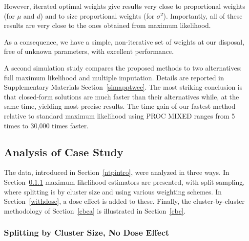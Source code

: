 \documentclass[11pt,a5paper,twoside]{book}
\begin{document}
However, iterated optimal weights give results very close to proportional 
weights (for $\mu$ and $d$) and to size proportional weights (for $\sigma^2$). 
Importantly, all of these results are very close to the ones 
obtained from maximum likelihood.

As a consequence, we have a simple, non-iterative set of weights at our 
disposal, free of unknown parameters, with excellent performance.

A second simulation study compares the proposed methods to two alternatives: full maximum likelihood and multiple imputation. Details are reported in Supplementary Materials Section~\ref{simapptwee}.
The most striking conclusion is that closed-form solutions are  much faster than their alternatives while, at the same time, yielding most precise results.
The time gain of our fastest method relative to standard maximum likelihood using PROC MIXED ranges from 5 times to 30,000 times faster.


\subsection{Analysis of Case Study}
\label{dataanal}

The data, introduced in Section~\ref{ntpintro}, 
were analyzed in three ways. 
In Section~\ref{basic} 
maximum likelihood estimators are presented, with split sampling, where splitting is by cluster size and using various weighting schemes. In Section~\ref{withdose}, 
a dose effect is added to these. Finally, the cluster-by-cluster methodology of Section~\ref{cbca} 
is illustrated in Section~\ref{cbc}.

\subsubsection{Splitting by Cluster Size, No Dose Effect}
\label{basic}
\end{document}
